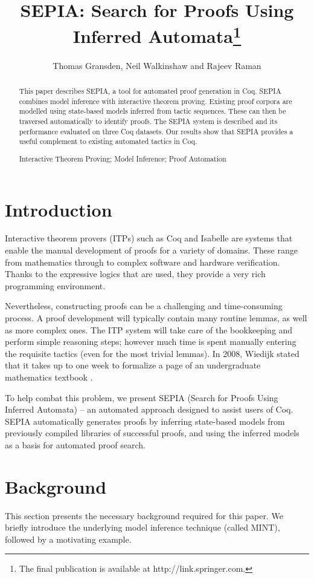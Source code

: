 \documentclass{llncs}
\title{SEPIA: Search for Proofs Using Inferred Automata\thanks{The final publication is available at http://link.springer.com.}}
\author{Thomas Gransden, Neil Walkinshaw and Rajeev Raman}
\institute{Department of Computer Science, University of Leicester, UK.\\ \email{tg75@student.le.ac.uk, {\{nw91,rr29\}}@leicester.ac.uk}}
\begin{document}
\raggedbottom
\maketitle

\begin{abstract}
This paper describes SEPIA, a tool for automated proof generation in Coq. SEPIA combines model inference with interactive theorem proving. Existing proof corpora are modelled using state-based models inferred from tactic sequences. These can then be traversed automatically to identify proofs. The SEPIA system is described and its performance evaluated on three Coq datasets. Our results show that SEPIA provides a useful complement to existing automated tactics in Coq.
\begin{keywords}
Interactive Theorem Proving; Model Inference; Proof Automation
\end{keywords}
\end{abstract}

\section{Introduction}
Interactive theorem provers (ITPs) such as Coq \cite{Coq:manual} and Isabelle \cite{Isabelle02} are systems that enable the manual development of proofs for a variety of domains. These range from mathematics through to complex software and hardware verification. Thanks to the expressive logics that are used, they provide a very rich programming environment.

Nevertheless, constructing proofs can be a challenging and time-consuming process. A proof development will typically contain many routine lemmas, as well as more complex ones. The ITP system will take care of the bookkeeping and perform simple reasoning steps; however much time is spent manually entering the requisite tactics (even for the most trivial lemmas). In 2008, Wiedijk stated that it takes up to one week to formalize a page of an undergraduate mathematics textbook \cite{Freek08}.

To help combat this problem, we present SEPIA (Search for Proofs Using Inferred Automata) -- an automated approach designed to assist users of Coq. SEPIA automatically generates proofs by inferring state-based models from previously compiled libraries of successful proofs, and using the inferred models as a basis for automated proof search.

\section{Background}
\label{sec:background}
This section presents the necessary background required for this paper. We briefly introduce the underlying model inference technique (called MINT), followed by a motivating example.
\end{document}
